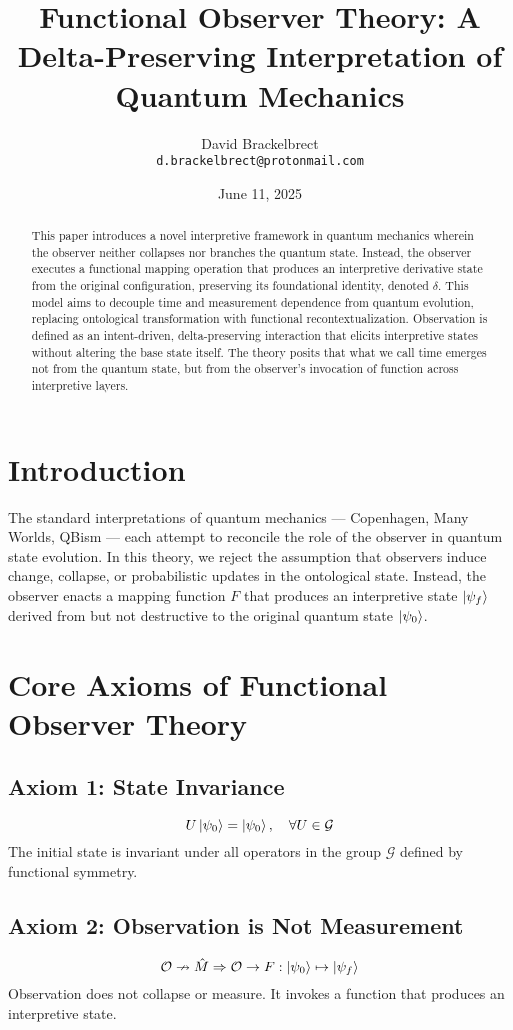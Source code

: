 \documentclass[12pt]{article}
\title{Functional Observer Theory: A Delta-Preserving Interpretation of Quantum Mechanics}
\author{David Brackelbrect\\ \texttt{d.brackelbrect@protonmail.com}}
\date{June 11, 2025}
\begin{document}
\maketitle

\begin{abstract}
This paper introduces a novel interpretive framework in quantum mechanics wherein the observer neither collapses nor branches the quantum state. Instead, the observer executes a functional mapping operation that produces an interpretive derivative state from the original configuration, preserving its foundational identity, denoted $\delta$. This model aims to decouple time and measurement dependence from quantum evolution, replacing ontological transformation with functional recontextualization. Observation is defined as an intent-driven, delta-preserving interaction that elicits interpretive states without altering the base state itself. The theory posits that what we call time emerges not from the quantum state, but from the observer's invocation of function across interpretive layers.
\end{abstract}

\section{Introduction}

The standard interpretations of quantum mechanics --- Copenhagen, Many Worlds, QBism --- each attempt to reconcile the role of the observer in quantum state evolution. In this theory, we reject the assumption that observers induce change, collapse, or probabilistic updates in the ontological state. Instead, the observer enacts a mapping function $F$ that produces an interpretive state $\ket{\psi_f}$ derived from but not destructive to the original quantum state $\ket{\psi_0}$.

\section{Core Axioms of Functional Observer Theory}

\subsection*{Axiom 1: State Invariance}
\[
U \ket{\psi_0} = \ket{\psi_0}, \quad \forall U \in \mathcal{G}
\]
The initial state is invariant under all operators in the group $\mathcal{G}$ defined by functional symmetry.

\subsection*{Axiom 2: Observation is Not Measurement}
\[
\mathcal{O} \nrightarrow \hat{M} \Rightarrow \mathcal{O} \rightarrow F : \ket{\psi_0} \mapsto \ket{\psi_f}
\]
Observation does not collapse or measure. It invokes a function that produces an interpretive state.
\end{document}

